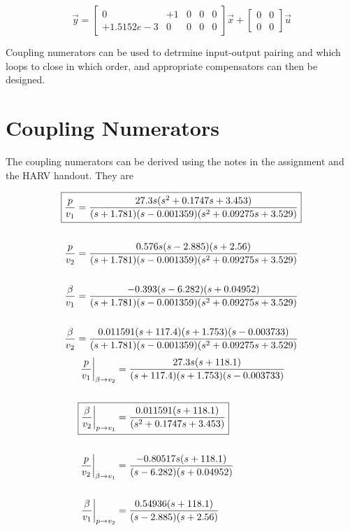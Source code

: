 \documentclass[11pt]{article}
\begin{document}
$$
\vec{y} = \left[ \begin{array}{ccccc}
           0 &         +1 &           0 &           0 &           0 \\
  +1.5152e-3 &          0 &           0 &           0 &           0 \end{array} \right]
\vec{x}+\left[\begin{array}{ccc}
         0 &         0 \\
         0 &         0 \end{array}\right]\vec{u}
$$

\noindent Coupling numerators can be used to detrmine input-output pairing and which loops to close in which order, and appropriate compensators can then be designed.

\clearpage
\section{Coupling Numerators}

The coupling numerators can be derived using the notes in the assignment and the HARV handout. They are

\begin{gather*}
\begin{split}
\Aboxed{\dfrac{p}{v_1} & =\dfrac{27.3 s (s^2 + 0.1747s + 3.453)} {(s+1.781) (s-0.001359) (s^2 + 0.09275s + 3.529)}} \\
\\
\dfrac{p}{v_2} & =\dfrac{0.576 s (s-2.885) (s+2.56)}
                      {(s+1.781) (s-0.001359) (s^2 + 0.09275s + 3.529)} \\
\\
\dfrac{\beta}{v_1} & =\dfrac{-0.393 (s-6.282) (s+0.04952)}
                          {(s+1.781) (s-0.001359) (s^2 + 0.09275s + 3.529)} \\
\\
\dfrac{\beta}{v_2} & =\dfrac{0.011591 (s+117.4) (s+1.753) (s-0.003733)}
                          {(s+1.781) (s-0.001359) (s^2 + 0.09275s + 3.529)} \\
\end{split}
\end{gather*}
\begin{gather*}
\begin{split}
\dfrac{p}{v_1}\biggr\rvert_{\beta \rightarrow v_2}
             & = \dfrac{27.3 s (s+118.1)}{(s+117.4) (s+1.753) (s-0.003733)} \\
\\
\Aboxed{\dfrac{\beta}{v_2}\biggr\rvert_{p \rightarrow v_1}
             & = \dfrac{0.011591 (s+118.1)}{(s^2 + 0.1747s + 3.453)}} \\
\\
\dfrac{p}{v_2}\biggr\rvert_{\beta \rightarrow v_1}
             & = \dfrac{-0.80517 s (s+118.1)}{(s-6.282) (s+0.04952)} \\
\\
\dfrac{\beta}{v_1}\biggr\rvert_{p \rightarrow v_2}
             & = \dfrac{0.54936 (s+118.1)}{(s-2.885) (s+2.56)} \\
\end{split}
\end{gather*}
\end{document}
